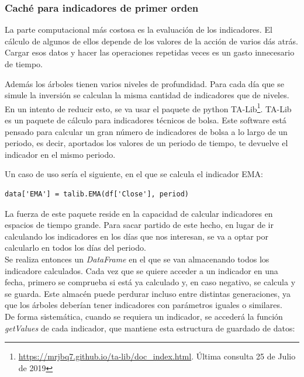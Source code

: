 \subsubsection{Cach\'e para indicadores de primer orden}
La parte computacional m\'as costosa es la evaluaci\'on de los indicadores. El c\'alculo de algunos de ellos depende de los valores de la acci\'on de varios d\'as atr\'as. Cargar esos datos y hacer las operaciones repetidas veces es un gasto innecesario de tiempo.

Adem\'as los \'arboles tienen varios niveles de profundidad. Para cada d\'ia que se simule la inversi\'on se calculan la misma cantidad de indicadores que de niveles.\\

En un intento de reducir esto, se va usar el paquete de python TA-Lib\footnote{\url{https://mrjbq7.github.io/ta-lib/doc_index.html}. \'Ultima consulta 25 de Julio de 2019}.
TA-Lib es un paquete de c\'alculo para indicadores t\'ecnicos de bolsa. Este software est\'a pensado para calcular un gran n\'umero de indicadores de bolsa a lo largo de un periodo, es decir, aportados los valores de un periodo de tiempo, te devuelve el indicador en el mismo periodo.

Un caso de uso ser\'ia el siguiente, en el que se calcula el indicador EMA:\\

\begin{lstlisting}
data['EMA'] = talib.EMA(df['Close'], period)
\end{lstlisting}

La fuerza de este paquete reside en la capacidad de calcular indicadores en espacios de tiempo grande. Para sacar partido de este hecho, en lugar de ir calculando los indicadores en los d\'ias que nos interesan, se va a optar por calcularlo en todos los d\'ias del periodo.\\

Se realiza entonces un \textit{DataFrame} en el que se van almacenando todos los indicadore calculados. Cada vez que se quiere acceder a un indicador en una fecha, primero se comprueba si est\'a ya calculado y, en caso negativo, se calcula y se guarda. Este almac\'en puede perdurar incluso entre distintas generaciones, ya que los \'arboles deber\'ian tener indicadores con par\'ametros iguales o similares.\\ 

De forma sistem\'atica, cuando se requiera un indicador, se acceder\'a la funci\'on \textit{getValues} de cada indicador, que mantiene esta estructura de guardado de datos:

